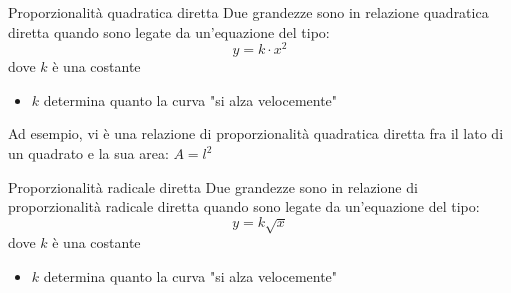 \begin{definizione}{Proporzionalità quadratica diretta}
	Due grandezze sono in relazione quadratica diretta quando sono legate da un'equazione del tipo:
	\[
		y = k \cdot x^2
	\]
	dove $ k $ è una costante
	\vskip3mm
	\begin{minipage}[c]{0.48\textwidth}
	\end{minipage}
	\begin{minipage}[c]{0.48\textwidth}
		\begin{itemize}
			\item $ k $ determina quanto la curva "si alza velocemente"
		\end{itemize}
	\end{minipage}
\end{definizione}
Ad esempio, vi è una relazione di proporzionalità quadratica diretta fra il lato di un quadrato e la sua area: $ A = l^2 $
\begin{definizione}{Proporzionalità radicale diretta}
	Due grandezze sono in relazione di proporzionalità radicale diretta quando sono legate da un'equazione del tipo:
	\[
		y = k \sqrt{x}
	\]
	dove $ k $ è una costante
	\vskip3mm
	\begin{minipage}[c]{0.48\textwidth}
	\end{minipage}
	\begin{minipage}[c]{0.48\textwidth}
		\begin{itemize}
			\item $ k $ determina quanto la curva "si alza velocemente"
		\end{itemize}
	\end{minipage}
\end{definizione}
